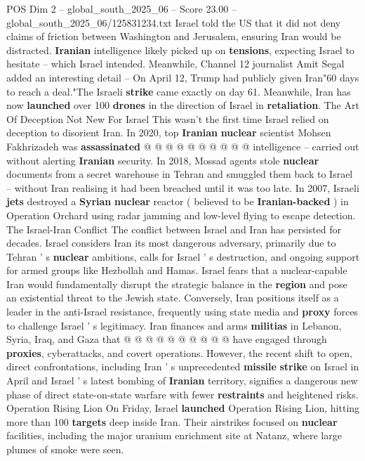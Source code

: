\begin{textsample}{POS Dim 2 – global\_south\_2025\_06 – Score 23.00 – global\_south\_2025\_06/125831234.txt}
Israel told the US that it did not deny claims of friction between Washington and Jerusalem, ensuring Iran would be distracted. \textbf{Iranian} intelligence likely picked up on \textbf{tensions}, expecting Israel to hesitate -- which Israel intended.
Meanwhile, Channel 12 journalist Amit Segal added an interesting detail -- On April 12, Trump had publicly given Iran"60 days to reach a deal."The Israeli \textbf{strike} came exactly on day 61.
Meanwhile, Iran has now \textbf{launched} over 100 \textbf{drones} in the direction of Israel in \textbf{retaliation}.
The Art Of Deception Not New For Israel This wasn't the first time Israel relied on deception to disorient Iran.
In 2020, top \textbf{Iranian} \textbf{nuclear} scientist Mohsen Fakhrizadeh was \textbf{assassinated} @ @ @ @ @ @ @ @ @ @ intelligence -- carried out without alerting \textbf{Iranian} security.
In 2018, Mossad agents stole \textbf{nuclear} documents from a secret warehouse in Tehran and smuggled them back to Israel -- without Iran realising it had been breached until it was too late.
In 2007, Israeli \textbf{jets} destroyed a \textbf{Syrian} \textbf{nuclear} reactor ( believed to be \textbf{Iranian-backed} ) in Operation Orchard using radar jamming and low-level flying to escape detection.
The Israel-Iran Conflict The conflict between Israel and Iran has persisted for decades.
Israel considers Iran its most dangerous adversary, primarily due to Tehran ' s \textbf{nuclear} ambitions, calls for Israel ' s destruction, and ongoing support for armed groups like Hezbollah and Hamas.
Israel fears that a nuclear-capable Iran would fundamentally disrupt the strategic balance in the \textbf{region} and pose an existential threat to the Jewish state.
Conversely, Iran positions itself as a leader in the anti-Israel resistance, frequently using state media and \textbf{proxy} forces to challenge Israel ' s legitimacy.
Iran finances and arms \textbf{militias} in Lebanon, Syria, Iraq, and Gaza that @ @ @ @ @ @ @ @ @ @ have engaged through \textbf{proxies}, cyberattacks, and covert operations.
However, the recent shift to open, direct confrontations, including Iran ' s unprecedented \textbf{missile} \textbf{strike} on Israel in April and Israel ' s latest bombing of \textbf{Iranian} territory, signifies a dangerous new phase of direct state-on-state warfare with fewer \textbf{restraints} and heightened risks.
Operation Rising Lion On Friday, Israel \textbf{launched} Operation Rising Lion, hitting more than 100 \textbf{targets} deep inside Iran.
Their airstrikes focused on \textbf{nuclear} facilities, including the major uranium enrichment site at Natanz, where large plumes of smoke were seen.

\end{textsample}
